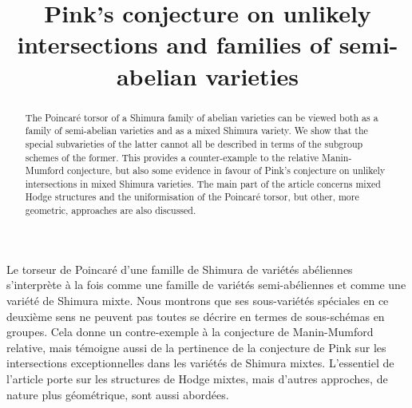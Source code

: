 \documentclass[JEP,XML,SOM,Unicode,NoFloatCountersInSection]{cedram}
\theoremstyle{plain}
\theoremstyle{definition}
\numberwithin{equation}{subsection}
\begin{document}
\frontmatter

\title{Pink's conjecture on unlikely intersections and families of
semi-abelian varieties}

\author[\initial{D.} \lastname{Bertrand}]{ }
\address{Institut de Mathématiques, Sorbonne Université\\
Case 247, 4, Place Jussieu F-75252 Paris Cedex 05, France}

\author[\initial{B.} \lastname{Edixhoven}]{ }
\address{Mathematical Institute, Universiteit Leiden\\
P.O. Box 9512, 2300 RA Leiden, The Netherlands}

\begin{abstract}
The Poincaré torsor of a Shimura family of abelian varieties can be viewed both as a family of semi-abelian varieties and as a mixed Shimura variety. We show that the special subvarieties of the latter cannot all be described in terms of the subgroup schemes of the former. This provides a counter-example to the relative Manin-Mumford conjecture, but also some evidence in favour of Pink's conjecture on unlikely intersections in mixed Shimura varieties. The main part of the article concerns mixed Hodge structures and the uniformisation of the Poincaré torsor, but other, more geometric, approaches are also discussed.
\end{abstract}





\begin{altabstract}
Le torseur de Poincaré d'une famille de Shimura de variétés abéliennes s'interprète à la fois comme une famille de variétés semi-abéliennes et comme une variété de Shimura mixte. Nous montrons que ses sous-variétés spéciales en ce deuxième sens ne peuvent pas toutes se décrire en termes de sous-schémas en groupes. Cela donne un contre-exemple à la conjecture de Manin-Mumford relative, mais témoigne aussi de la pertinence de la conjecture de Pink sur les intersections exceptionnelles dans les variétés de Shimura mixtes. L'essentiel de l'article porte sur les structures de Hodge mixtes, mais d'autres approches, de nature plus géométrique, sont aussi abordées.
\end{altabstract}
\end{document}
